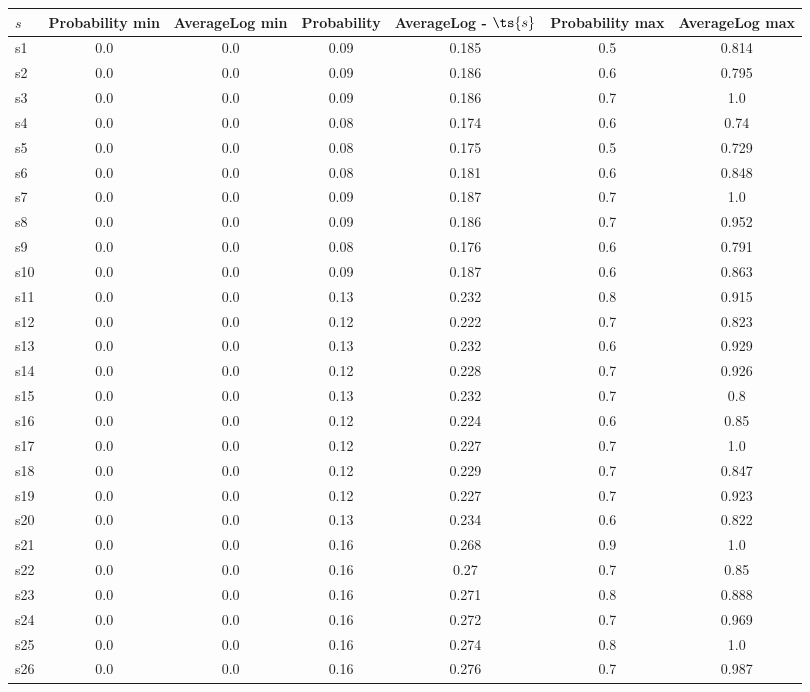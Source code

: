 \documentclass{article}
\begin{document}
\noindent\begin{tabular}{|l|c|c|c|c|c|c|}
\hline
$s$& Probability min & AverageLog min & Probability & AverageLog - $\ts{s}$ & Probability max & AverageLog max\\
\hline
s1 &0.0 & 0.0 & 0.09 & 0.185 & 0.5 & 0.814\\
\hline
s2 &0.0 & 0.0 & 0.09 & 0.186 & 0.6 & 0.795\\
\hline
s3 &0.0 & 0.0 & 0.09 & 0.186 & 0.7 & 1.0\\
\hline
s4 &0.0 & 0.0 & 0.08 & 0.174 & 0.6 & 0.74\\
\hline
s5 &0.0 & 0.0 & 0.08 & 0.175 & 0.5 & 0.729\\
\hline
s6 &0.0 & 0.0 & 0.08 & 0.181 & 0.6 & 0.848\\
\hline
s7 &0.0 & 0.0 & 0.09 & 0.187 & 0.7 & 1.0\\
\hline
s8 &0.0 & 0.0 & 0.09 & 0.186 & 0.7 & 0.952\\
\hline
s9 &0.0 & 0.0 & 0.08 & 0.176 & 0.6 & 0.791\\
\hline
s10 &0.0 & 0.0 & 0.09 & 0.187 & 0.6 & 0.863\\
\hline
s11 &0.0 & 0.0 & 0.13 & 0.232 & 0.8 & 0.915\\
\hline
s12 &0.0 & 0.0 & 0.12 & 0.222 & 0.7 & 0.823\\
\hline
s13 &0.0 & 0.0 & 0.13 & 0.232 & 0.6 & 0.929\\
\hline
s14 &0.0 & 0.0 & 0.12 & 0.228 & 0.7 & 0.926\\
\hline
s15 &0.0 & 0.0 & 0.13 & 0.232 & 0.7 & 0.8\\
\hline
s16 &0.0 & 0.0 & 0.12 & 0.224 & 0.6 & 0.85\\
\hline
s17 &0.0 & 0.0 & 0.12 & 0.227 & 0.7 & 1.0\\
\hline
s18 &0.0 & 0.0 & 0.12 & 0.229 & 0.7 & 0.847\\
\hline
s19 &0.0 & 0.0 & 0.12 & 0.227 & 0.7 & 0.923\\
\hline
s20 &0.0 & 0.0 & 0.13 & 0.234 & 0.6 & 0.822\\
\hline
s21 &0.0 & 0.0 & 0.16 & 0.268 & 0.9 & 1.0\\
\hline
s22 &0.0 & 0.0 & 0.16 & 0.27 & 0.7 & 0.85\\
\hline
s23 &0.0 & 0.0 & 0.16 & 0.271 & 0.8 & 0.888\\
\hline
s24 &0.0 & 0.0 & 0.16 & 0.272 & 0.7 & 0.969\\
\hline
s25 &0.0 & 0.0 & 0.16 & 0.274 & 0.8 & 1.0\\
\hline
s26 &0.0 & 0.0 & 0.16 & 0.276 & 0.7 & 0.987\\

\end{tabular}
\end{document}
